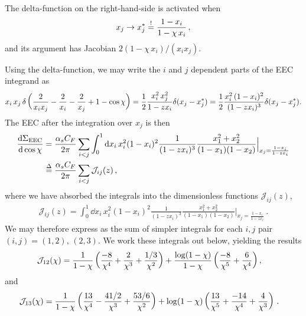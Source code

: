 The delta-function on the right-hand-side is activated when
\begin{align}
    x_j \to x_j^* \overset{!}{=} \frac{1-x_i}{1-\chi\,x_i}
    \,,
\end{align}
and its argument has Jacobian \(2(1 - \chi\,x_i)/(x_i x_j)\).

Using the delta-function, we may write the \(i\) and \(j\) dependent parts of the EEC integrand as
\begin{align}
    x_i\,x_j\,
    \delta\left(
        \frac{2}{x_i x_j} - \frac{2}{x_i} - \frac{2}{x_j} + 1
        -
        \cos\chi
    \right)
    =
    \frac{1}{2}
    \frac{x_i^2\,x_j^2}{1 - z x_i}
    \delta(x_j - x_j^*)
    =
    \frac{1}{2}
    \frac{x_i^2\,(1-x_i)^2}{(1 - z x_i)^3}
    \delta(x_j - x_j^*)
    .
\end{align}
%
The EEC after the integration over \(x_j\) is then
\begin{align}
    \dv{\Sigma_\text{EEC}}{\cos\chi}{}
    &=
    \frac{\alpha_s C_F}{2\pi}
    \sum_{i<j}
    \int_0^1 \dd x_i\,
    x_i^2 (1 - x_i)^2
    \frac{1}{(1- z x_i)^3}
    \frac{x_1^2 + x_2^2}{(1-x_1)(1-x_2)}
    \Big|_{x_j = \frac{1-x_i}{1-z x_i}}
    \\
    &
    \overset{\Delta}{=}
    \frac{\alpha_s C_F}{2\pi}
    \sum_{i<j}
    {\mathcal{J}}_{ij}(z)
    \,,
\end{align}
where we have absorbed the integrals into the dimensionless functions \(\mathcal{J}_{ij}(z)\),
\begin{align}
    {\mathcal{J}}_{ij}(z)
    =
    \int_0^1 \dd x_i\,
    x_i^2 (1 - x_i)^2
    \frac{1}{(1- z x_i)^3}
    \frac{x_1^2 + x_2^2}{(1-x_1)(1-x_2)}
    \Big|_{x_j = \frac{1-x_i}{1-z x_i}}
    \label{eq:eec_integrals}
    \,.
\end{align}
%
We may therefore express  as the sum of simpler integrals for each \(i, j\) pair \((i, j) = (1,2),\,(2,3)\).
%
We work these integrals out below, yielding the results
\begin{align}
    \mathcal{J}_{12}(\chi)
    &=
   \frac{1}{1-\chi}
   \left(
    \frac{-8}{\chi^4} + \frac{2}{\chi^3} + \frac{1/3}{\chi^2}
   \right)
   +
   \frac{\log(1-\chi)}{1-\chi}
   \left(
    \frac{-8}{\chi^5} + \frac{6}{\chi^4}
   \right)
    ,
\end{align}
and
\begin{align}
    \mathcal{J}_{13}(\chi)
    &=
    \frac{1}{1-\chi} \left(
        \frac{13}{\chi^4}
        -
        \frac{41/2}{\chi^3}
        +
        \frac{53/6}{\chi^2}
    \right)
    +
    \log(1-\chi)\left(
        \frac{13}{\chi^5}
        +
        \frac{-14}{\chi^4}
        +
        \frac{4}{\chi^3}
    \right)
    \,.
\end{align}

